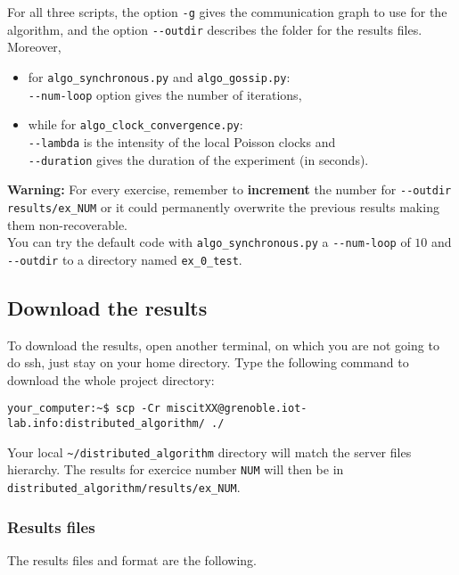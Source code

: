 \documentclass{article}
\begin{document}
For all three scripts, the option \verb=-g= gives the communication graph to use for the algorithm,
and the option \verb=--outdir= describes the folder for the results files.\\

Moreover,
\begin{itemize}
    \item for \verb=algo_synchronous.py= and \verb=algo_gossip.py=:\\
        \verb=--num-loop= option gives the number of iterations,
    \item while for \verb=algo_clock_convergence.py=:\\
        \verb=--lambda= is the intensity of the local Poisson clocks and\\
        \verb=--duration= gives the duration of the experiment (in seconds).
\end{itemize}

\textbf{Warning:} For every exercise, remember to \textbf{increment} the number for \verb=--outdir results/ex_NUM=
or it could permanently overwrite the previous results making them non-recoverable.\\

You can try the default code with \verb=algo_synchronous.py= a \verb=--num-loop= of $10$ and
\verb=--outdir= to a directory named \verb=ex_0_test=.


\subsection{Download the results}

To download the results, open another terminal, on which you are not going to do ssh, just stay on your home directory.
Type the following command to download the whole project directory:
\begin{verbatim}
your_computer:~$ scp -Cr miscitXX@grenoble.iot-lab.info:distributed_algorithm/ ./
\end{verbatim}

Your local \verb=~/distributed_algorithm= directory will match the server files hierarchy.
The results for exercice number \verb=NUM= will then be in \verb=distributed_algorithm/results/ex_NUM=.

\subsubsection{Results files}

The results files and format are the following.
\end{document}
